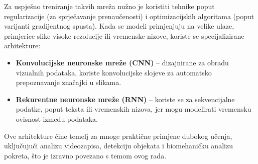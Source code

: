 \documentclass[zavrsnirad]{fer}
\begin{document}
Za uspješno treniranje takvih mreža nužno je koristiti tehnike poput regularizacije (za sprječavanje prenaučenosti) i optimizacijskih algoritama (poput varijanti gradijentnog spusta). 
Kada se modeli primjenjuju na velike ulaze, primjerice slike visoke rezolucije ili vremenske nizove, koriste se specijalizirane arhitekture:
\begin{itemize}
  \item \textbf{Konvolucijske neuronske mreže (CNN)} – dizajnirane za obradu vizualnih podataka, koriste konvolucijske slojeve za automatsko prepoznavanje značajki u slikama.
  \item \textbf{Rekurentne neuronske mreže (RNN)} – koriste se za sekvencijalne podatke, poput teksta ili vremenskih nizova, jer mogu modelirati vremensku ovisnost između podataka.
\end{itemize}

Ove arhitekture čine temelj za mnoge praktične primjene dubokog učenja, uključujući analizu videozapisa, detekciju objekata i biomehaničku analizu pokreta, što je izravno povezano s temom ovog rada.
\end{document}
